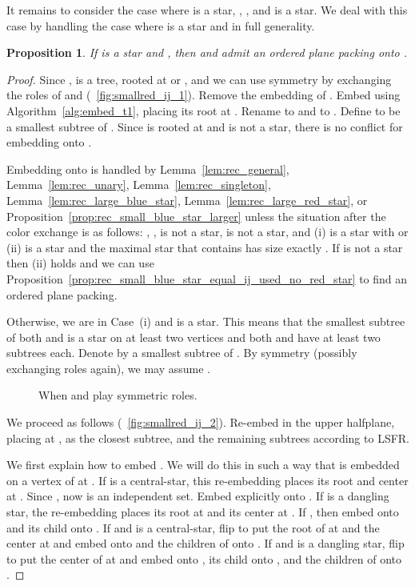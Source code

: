 \documentclass[11pt,a4paper,colorlinks=true,urlcolor=blue,citecolor=red]{article}
\theoremstyle{plain}
\newtheorem{proposition}[theorem]{Proposition}
\begin{document}
It remains to consider the case where  is a star, , , and  is a star. We deal with this
case by handling the case where  is a star and  in
full generality.

\begin{proposition}\label{prop:rec_small_red_star_ij_used}
  If  is a star and , then  and  admit
  an ordered plane packing onto .
\end{proposition}
\begin{proof}
  Since ,  is a tree, rooted at  or ,
  and we can use symmetry by exchanging the roles of  and 
  (\figurename~\ref{fig:smallred_ij_1}). Remove the embedding of .
  Embed  using Algorithm~\ref{alg:embed_t1}, placing its root at .
  Rename  to  and  to . Define  to be a smallest subtree
  of . Since  is rooted at  and  is not a star, there is no
  conflict for embedding  onto .

  Embedding  onto  is handled by Lemma~\ref{lem:rec_general},
  Lemma~\ref{lem:rec_unary}, Lemma~\ref{lem:rec_singleton},
  Lemma~\ref{lem:rec_large_blue_star},
  Lemma~\ref{lem:rec_large_red_star}, or
  Proposition~\ref{prop:rec_small_blue_star_larger} unless the situation
  after the color exchange is as follows: , ,
   is not a star,  is not a star, and (i)  is a star
  with  or (ii)  is a star and the maximal star
  that contains  has size exactly . If  is not a
  star then (ii) holds and we can use
  Proposition~\ref{prop:rec_small_blue_star_equal_ij_used_no_red_star}
  to find an ordered plane packing.

  Otherwise, we are in Case~(i) and  is a star. This means that the
  smallest subtree of both  and  is a star on at least two
  vertices and both  and  have at least two subtrees each. Denote
  by  a smallest subtree of . By symmetry (possibly exchanging
  roles again), we may assume .

  \begin{figure}[htbp]
    \centering\hfil {}\hfil {}\hfil \caption{When  and  play symmetric
      roles.\label{fig:smallred_ij}}
  \end{figure}

  We proceed as follows (\figurename~\ref{fig:smallred_ij_2}). Re-embed
   in the upper halfplane, placing  at ,  as the closest
  subtree, and the remaining subtrees according to LSFR.

  We first explain how to embed . We will do this in such a way that
   is embedded on a vertex of  at .
If  is a central-star, this re-embedding places its root and
  center at . Since , now  is an
  independent set. Embed  explicitly onto .
If  is a dangling star, the re-embedding places its root at
   and its center at . If , then embed  onto
   and its child onto .
If  and  is a central-star, flip  to
  put the root of  at  and the center at  and embed
   onto  and the children of  onto .
If  and  is a dangling star, flip  to
  put the center of  at  and embed  onto ,
  its child  onto , and the children of  onto
  .


\end{proof}
\end{document}
